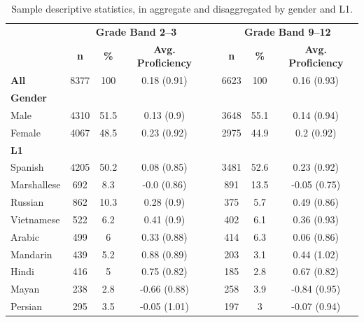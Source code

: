 \documentclass [PhD] {uclathes}
\begin{document}
\begin{table}[htbp]
\centering
\caption{\label{smp_dscr} Sample descriptive statistics, in aggregate and disaggregated by gender and L1.}
\begin{tabular}{lccccccc}
\toprule
    & \multicolumn{3}{c}{\textbf{Grade Band 2–3}} & \multicolumn{1}{c}{ } & \multicolumn{3}{c}{\textbf{Grade Band 9–12}} \\
    \cline{2-4}
    \cline{6-8}
     & \textbf{n} & \textbf{\%} & \textbf{Avg. Proficiency} & & \textbf{n} & \textbf{\%} & \textbf{Avg. Proficiency} \\
    \midrule
    \textbf{All} & 8377 & 100 & 0.18 (0.91) & & 6623 & 100 & 0.16 (0.93) \\
    \textbf{Gender} &  &  &  & &  &  &  \\
    \hspace{3mm} Male & 4310 & 51.5 & 0.13 (0.9) & & 3648 & 55.1 & 0.14 (0.94) \\
    \hspace{3mm} Female & 4067 & 48.5 & 0.23 (0.92) & & 2975 & 44.9 & 0.2 (0.92) \\
    \textbf{L1} &  &  &  & &  &  &  \\
    \hspace{3mm} Spanish & 4205 & 50.2 & 0.08 (0.85) & & 3481 & 52.6 & 0.23 (0.92) \\
    \hspace{3mm} Marshallese & 692 & 8.3 & -0.0 (0.86) & & 891 & 13.5 & -0.05 (0.75) \\
    \hspace{3mm} Russian & 862 & 10.3 & 0.28 (0.9) & & 375 & 5.7 & 0.49 (0.86) \\
    \hspace{3mm} Vietnamese & 522 & 6.2 & 0.41 (0.9) & & 402 & 6.1 & 0.36 (0.93) \\
    \hspace{3mm} Arabic & 499 & 6 & 0.33 (0.88) & & 414 & 6.3 & 0.06 (0.86) \\
    \hspace{3mm} Mandarin & 439 & 5.2 & 0.88 (0.89) & & 203 & 3.1 & 0.44 (1.02) \\
    \hspace{3mm} Hindi & 416 & 5 & 0.75 (0.82) & & 185 & 2.8 & 0.67 (0.82) \\
    \hspace{3mm} Mayan & 238 & 2.8 & -0.66 (0.88) & & 258 & 3.9 & -0.84 (0.95) \\
    \hspace{3mm} Persian & 295 & 3.5 & -0.05 (1.01) & & 197 & 3 & -0.07 (0.94) \\

\end{tabular}
\end{table}
\end{document}
